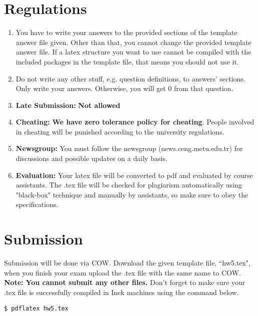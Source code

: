 \documentclass[11pt]{article}
\begin{document}
\section{Regulations}
\begin{enumerate}
\item \textbf{}You have to write your answers to the provided sections of the template answer file given. Other than that, you cannot change the provided template answer file. If a latex structure you want to use cannot be compiled with the included packages in the template file, that means you should not use it.
\item \textbf{}Do not write any other stuff, e.g. question definitions, to answers' sections. Only write your answers. Otherwise, you will get 0 from that question.
\item \textbf{Late Submission:} \textbf{Not allowed} 
\item \textbf{Cheating:} \textbf{We have zero tolerance policy for cheating}. People involved in cheating will be punished according to the university regulations.
\item \textbf{Newsgroup:} You must follow the newsgroup (news.ceng.metu.edu.tr) for discussions and possible updates on a daily basis.
\item \textbf{Evaluation:} Your latex file will be converted to pdf and evaluated by course assistants. The .tex file will be checked for plagiarism automatically using "black-box" technique and manually by assistants, so make sure to obey the specifications.
\end{enumerate}


\section{Submission}
Submission will be done via COW. Download the given template file, ``hw5.tex", when you finish your exam upload the .tex file with the same name to COW.  
\\
\noindent
\textbf{Note:} \textbf{You cannot submit any other files.} Don't forget to make sure your .tex file is successfully compiled in Inek machines using the command below. 
\small
\begin{verbatim}
$ pdflatex hw5.tex
\end{verbatim}
\normalsize
\end{document}
